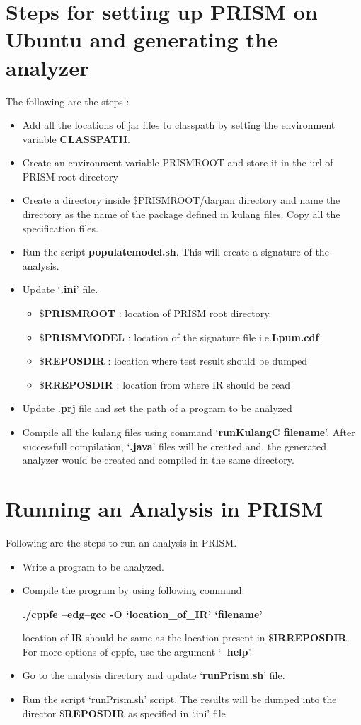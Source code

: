 \documentclass[11pt,a4paper,openright]{report}
\begin{document}
\section{Steps for setting up PRISM on Ubuntu and generating the analyzer}

The following are the steps :
\begin{itemize}
 \item  Add all the locations of jar files to classpath by setting the environment variable \textbf{CLASSPATH}. 
 \item Create an environment variable PRISMROOT and store it in the url of PRISM root directory
 \item Create a directory inside \$PRISMROOT/darpan directory and name the directory as the name of the package defined in kulang 
 files. Copy all the specification files.
 \item Run the script \textbf{populatemodel.sh}. This will create a signature of the analysis.
 \item Update `\textbf{.ini}' file.
	\begin{itemize}
	 \item \$\textbf{PRISMROOT} : location of PRISM root directory.
	 \item \$\textbf{PRISMMODEL} : location of the signature file i.e.\textbf{Lpum.cdf}
	 \item \$\textbf{REPOSDIR} : location where test result should be dumped
	 \item \$\textbf{RREPOSDIR} : location from where IR should be read
	\end{itemize}
\item Update  \textbf{.prj} file and set the path of a program to be analyzed
\item Compile all the kulang files using command `\textbf{runKulangC filename}'. After successfull compilation, `\textbf{.java}' 
 files will be created and, the generated analyzer would be created and compiled in the same directory.
\end{itemize}

\section{Running an Analysis in PRISM}
Following are the steps to run an analysis in PRISM.
\begin{itemize}
 \item Write a program to be analyzed.
 \item Compile the program by using following command:
 
 \textbf{./cppfe --edg--gcc -O `location\_of\_IR' `filename' }
 
 location of IR should be same as the location present in \$\textbf{IRREPOSDIR}. For more options of cppfe, use the argument 
 `\textbf{--help}'.
 
 \item Go to the analysis directory and update `\textbf{runPrism.sh}' file. 
 \item Run the script `runPrism.sh' script. The results will be dumped into the director \$\textbf{REPOSDIR} as specified in `.ini' file
 \end{itemize}
\end{document}

